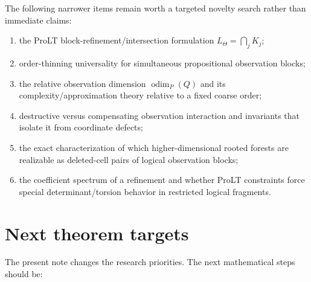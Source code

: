\documentclass[11pt]{article}
\theoremstyle{definition}
\newcommand{\odim}{\operatorname{odim}}
\begin{document}
The following narrower items remain worth a targeted novelty search rather than immediate claims:
\begin{enumerate}[label=(\alph*)]
\item the ProLT block-refinement/intersection formulation $L_\Theta=\bigcap_jK_j$;
\item order-thinning universality for simultaneous propositional observation blocks;
\item the relative observation dimension $\odim_P(Q)$ and its complexity/approximation theory relative to a fixed coarse order;
\item destructive versus compensating observation interaction and invariants that isolate it from coordinate defects;
\item the exact characterization of which higher-dimensional rooted forests are realizable as deleted-cell pairs of logical observation blocks;
\item the coefficient spectrum of a refinement and whether ProLT constraints force special determinant/torsion behavior in restricted logical fragments.
\end{enumerate}

\section{Next theorem targets}

The present note changes the research priorities. The next mathematical steps should be:
\end{document}
